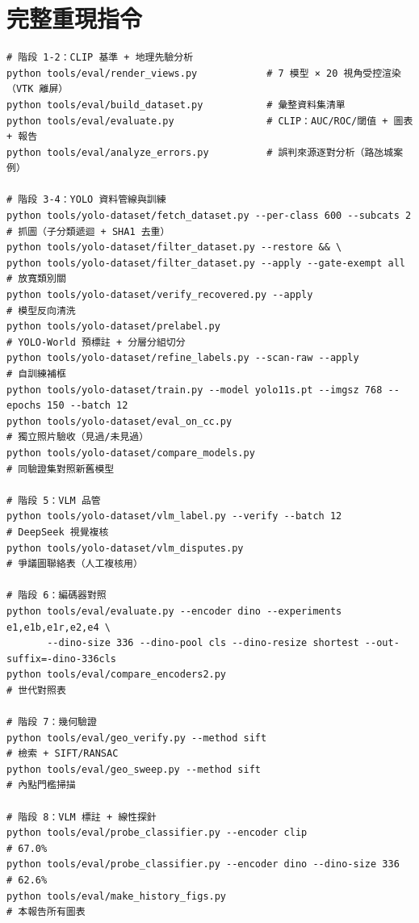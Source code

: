 \documentclass[11pt,a4paper,fontset=windows]{ctexart}
\begin{document}
\appendix
\section{完整重現指令}

\begin{verbatim}
# 階段 1-2：CLIP 基準 + 地理先驗分析
python tools/eval/render_views.py            # 7 模型 × 20 視角受控渲染（VTK 離屏）
python tools/eval/build_dataset.py           # 彙整資料集清單
python tools/eval/evaluate.py                # CLIP：AUC/ROC/閾值 + 圖表 + 報告
python tools/eval/analyze_errors.py          # 誤判來源逐對分析（路氹城案例）

# 階段 3-4：YOLO 資料管線與訓練
python tools/yolo-dataset/fetch_dataset.py --per-class 600 --subcats 2   # 抓圖（子分類遞迴 + SHA1 去重）
python tools/yolo-dataset/filter_dataset.py --restore && \
python tools/yolo-dataset/filter_dataset.py --apply --gate-exempt all   # 放寬類別關
python tools/yolo-dataset/verify_recovered.py --apply                    # 模型反向清洗
python tools/yolo-dataset/prelabel.py                                    # YOLO-World 預標註 + 分層分組切分
python tools/yolo-dataset/refine_labels.py --scan-raw --apply            # 自訓練補框
python tools/yolo-dataset/train.py --model yolo11s.pt --imgsz 768 --epochs 150 --batch 12
python tools/yolo-dataset/eval_on_cc.py                                  # 獨立照片驗收（見過/未見過）
python tools/yolo-dataset/compare_models.py                              # 同驗證集對照新舊模型

# 階段 5：VLM 品管
python tools/yolo-dataset/vlm_label.py --verify --batch 12               # DeepSeek 視覺複核
python tools/yolo-dataset/vlm_disputes.py                                # 爭議圖聯絡表（人工複核用）

# 階段 6：編碼器對照
python tools/eval/evaluate.py --encoder dino --experiments e1,e1b,e1r,e2,e4 \
       --dino-size 336 --dino-pool cls --dino-resize shortest --out-suffix=-dino-336cls
python tools/eval/compare_encoders2.py                                   # 世代對照表

# 階段 7：幾何驗證
python tools/eval/geo_verify.py --method sift                            # 檢索 + SIFT/RANSAC
python tools/eval/geo_sweep.py --method sift                             # 內點門檻掃描

# 階段 8：VLM 標註 + 線性探針
python tools/eval/probe_classifier.py --encoder clip                     # 67.0%
python tools/eval/probe_classifier.py --encoder dino --dino-size 336     # 62.6%
python tools/eval/make_history_figs.py                                   # 本報告所有圖表
\end{verbatim}
\end{document}
